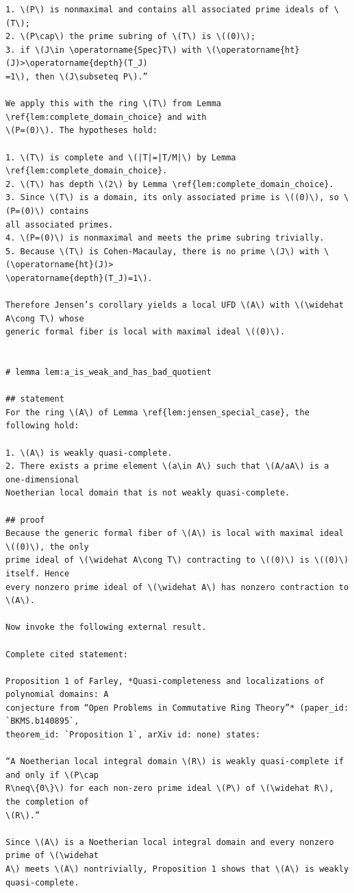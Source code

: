 \documentclass[]{pkuai4m}
\theoremstyle{plain}
\theoremstyle{definition}
\begin{document}
\begin{Verbatim}[commandchars=!??]
1. \(P\) is nonmaximal and contains all associated prime ideals of \(T\);
2. \(P\cap\) the prime subring of \(T\) is \((0)\);
3. if \(J\in \operatorname{Spec}T\) with \(\operatorname{ht}(J)>\operatorname{depth}(T_J)
=1\), then \(J\subseteq P\).”

We apply this with the ring \(T\) from Lemma \ref{lem:complete_domain_choice} and with 
\(P=(0)\). The hypotheses hold:

1. \(T\) is complete and \(|T|=|T/M|\) by Lemma \ref{lem:complete_domain_choice}.
2. \(T\) has depth \(2\) by Lemma \ref{lem:complete_domain_choice}.
3. Since \(T\) is a domain, its only associated prime is \((0)\), so \(P=(0)\) contains 
all associated primes.
4. \(P=(0)\) is nonmaximal and meets the prime subring trivially.
5. Because \(T\) is Cohen-Macaulay, there is no prime \(J\) with \(\operatorname{ht}(J)>
\operatorname{depth}(T_J)=1\).

Therefore Jensen’s corollary yields a local UFD \(A\) with \(\widehat A\cong T\) whose 
generic formal fiber is local with maximal ideal \((0)\).


# lemma lem:a_is_weak_and_has_bad_quotient

## statement
For the ring \(A\) of Lemma \ref{lem:jensen_special_case}, the following hold:

1. \(A\) is weakly quasi-complete.
2. There exists a prime element \(a\in A\) such that \(A/aA\) is a one-dimensional 
Noetherian local domain that is not weakly quasi-complete.

## proof
Because the generic formal fiber of \(A\) is local with maximal ideal \((0)\), the only 
prime ideal of \(\widehat A\cong T\) contracting to \((0)\) is \((0)\) itself. Hence 
every nonzero prime ideal of \(\widehat A\) has nonzero contraction to \(A\).

Now invoke the following external result.

Complete cited statement:

Proposition 1 of Farley, *Quasi-completeness and localizations of polynomial domains: A
conjecture from “Open Problems in Commutative Ring Theory”* (paper_id: `BKMS.b140895`, 
theorem_id: `Proposition 1`, arXiv id: none) states:

“A Noetherian local integral domain \(R\) is weakly quasi-complete if and only if \(P\cap
R\neq\{0\}\) for each non-zero prime ideal \(P\) of \(\widehat R\), the completion of 
\(R\).”

Since \(A\) is a Noetherian local integral domain and every nonzero prime of \(\widehat 
A\) meets \(A\) nontrivially, Proposition 1 shows that \(A\) is weakly quasi-complete.


\end{Verbatim}
\end{document}
